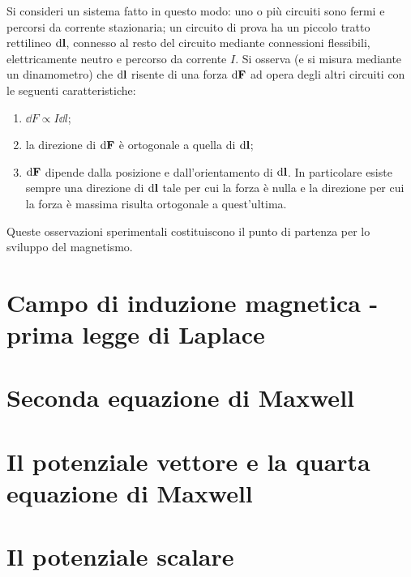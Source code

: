 \begin{obses}
    Si consideri un sistema fatto in questo modo:
    uno o più circuiti sono fermi e percorsi da corrente stazionaria;
    un circuito di prova ha un piccolo tratto rettilineo $\dd{\vb{l}}$, connesso al resto del circuito
    mediante connessioni flessibili, elettricamente neutro e percorso da corrente $I$.
    Si osserva (e si misura mediante un dinamometro) che $\dd{\vb{l}}$
    risente di una forza $\dd{\vb{F}}$ ad opera degli altri circuiti con le seguenti caratteristiche:
    \begin{enumerate}
        \item $\dd{F} \propto I\dd{l}$;
        \item la direzione di $\dd{\vb{F}}$ è ortogonale a quella di $\dd{\vb{l}}$;
        \item $\dd{\vb{F}}$ dipende dalla posizione e dall'orientamento di $\dd{\vb{l}}$. In particolare esiste sempre
            una direzione di $\dd{\vb{l}}$ tale per cui la forza è nulla e la direzione per cui la forza
            è massima risulta ortogonale a quest'ultima.
    \end{enumerate}
\end{obses}

Queste osservazioni sperimentali costituiscono il punto di partenza per lo sviluppo del magnetismo.


\section{Campo di induzione magnetica - prima legge di Laplace}


\section{Seconda equazione di Maxwell}


\section{Il potenziale vettore e la quarta equazione di Maxwell}
\label{par:potenziale_vettore}


\section{Il potenziale scalare}


